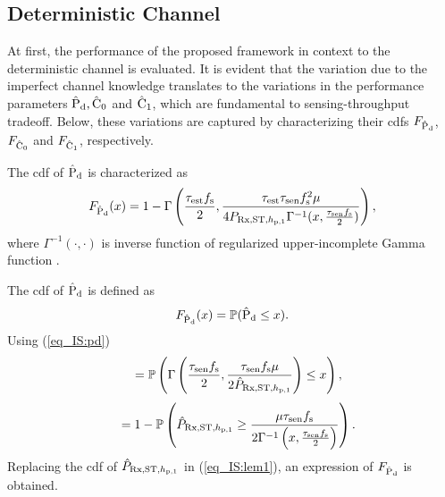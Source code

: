 \subsection{Deterministic Channel} \label{ssec:det_th}
At first, the performance of the proposed framework in context to the deterministic channel is evaluated.
It is evident that the variation due to the imperfect channel knowledge translates to the variations in the performance parameters $\hat{\text{P}}_{\text{d}}, \hat{\text{C}}_{\text{0}}$ and $\hat{\text{C}}_{\text{1}}$, which are fundamental to sensing-throughput tradeoff. Below, these variations are captured by characterizing their cdfs $F_{\hat{\text{P}}_{\text{d}}}$, $F_{\hat{\text{C}}_{\text{0}}}$ and $F_{\hat{\text{C}}_{\text{1}}}$, respectively.  
\begin{lemma} \label{lm_IS:lem1}
\normalfont
The cdf of $\hat{\text{P}}_{\text{d}}$ is characterized as 
\begin{align}
F_{\hat{\text{P}}_{\text{d}}}(x) = 1 - \Gamma \left(\frac{\tau_{\text{est}} f_{\text{s}}}{2}, \frac{\tau_{\text{est}} \tau_{\text{sen}} f_{\text{s}}^2 \mu}{4 P_{\text{Rx,ST,$h_{\text{p,1}}$}} \Gamma^{-1}(x, \frac{\tau_{\text{sen}} f_{\text{s}}}{2}) } \right), 
\label{eq_IS:fpd}
\end{align}
where $\Gamma^{-1}(\cdot, \cdot)$ is inverse function of regularized upper-incomplete Gamma function \cite{grad}.  
\end{lemma} 
\begin{IEEEproof}
The cdf of $\hat{\text{P}}_{\text{d}}$ is defined as 
\begin{align}
F_{\hat{\text{P}}_{\text{d}}}(x) = \mathbb P(\hat{\text{P}}_{\text{d}} \le x).
\end{align}
Using (\ref{eq_IS:pd})
\begin{align}
\quad =  \mathbb P \left( \Gamma \left( \frac{\tau_{\text{sen}} f_{\text{s}}}{2}, \frac{\tau_{\text{sen}} f_{\text{s}} \mu}{2 \hat{P}_{\text{Rx,ST,$h_{\text{p,1}}$}}} \right) \le x \right), 
\end{align}
\begin{align}
\quad =  1- \mathbb P \left( \hat{P}_{\text{Rx,ST,$h_{\text{p,1}}$}} \ge \frac{\mu \tau_{\text{sen}} f_{\text{s}}}{2 {\Gamma}^{-1}\left( x, \frac{\tau_{\text{sen}} f_{\text{s}}}{2} \right) } \right). \label{eq_IS:lem1} 
\end{align}
Replacing the cdf of $\hat{P}_{\text{Rx,ST,$h_{\text{p,1}}$}}$ in (\ref{eq_IS:lem1}), an expression of $F_{\hat{\text{P}}_{\text{d}}}$ is obtained.
\end{IEEEproof}
